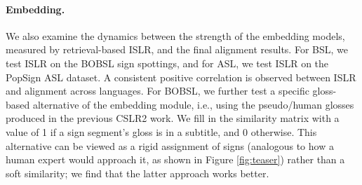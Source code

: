 \documentclass[11pt]{article}
\begin{document}
\paragraph{Embedding.} We also examine the dynamics between the strength of the embedding models, measured by retrieval-based ISLR, and the final alignment results. 
For BSL, we test ISLR on the BOBSL sign spottings, and for ASL, we test ISLR on the PopSign ASL dataset. A consistent positive correlation is observed between ISLR and alignment across languages.
For BOBSL, we further test a specific gloss-based alternative of the embedding module, i.e., using the pseudo/human glosses produced in the previous CSLR2 \cite{raude2024tale} work.
We fill in the similarity matrix with a value of 1 if a sign segment's gloss is in a subtitle, and 0 otherwise.
This alternative can be viewed as a rigid assignment of signs (analogous to how a human expert would approach it, as shown in Figure \ref{fig:teaser}) rather than a soft similarity; we find that the latter approach works better. 

\begin{table}[ht]
    \centering
    \caption{Sign segmentation results on BSL Corpus test set and alignment results on BOBSL validation set using the same segmentation model in \textit{Segment and Align}.}
    \label{tab:bsl-segmentation}
\end{table}
\end{document}
